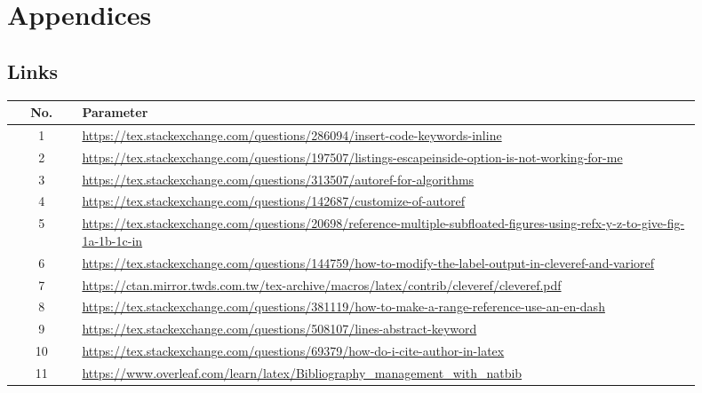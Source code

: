 \appendix
\section*{Appendices}
\renewcommand{\thesubsection}{\Alph{subsection}}

\subsection{Links}

\footnotesize
\begin{center}
    \label{table:lol}
    \begin{tabular}{ c p{0.9\linewidth} }
        \toprule
        No. & Parameter \\
        \midrule
        1 & \url{https://tex.stackexchange.com/questions/286094/insert-code-keywords-inline} \\
        2 & \url{https://tex.stackexchange.com/questions/197507/listings-escapeinside-option-is-not-working-for-me} \\
        3 & \url{https://tex.stackexchange.com/questions/313507/autoref-for-algorithms} \\
        4 & \url{https://tex.stackexchange.com/questions/142687/customize-of-autoref} \\
        5 & \url{https://tex.stackexchange.com/questions/20698/reference-multiple-subfloated-figures-using-refx-y-z-to-give-fig-1a-1b-1c-in} \\
        6 & \url{https://tex.stackexchange.com/questions/144759/how-to-modify-the-label-output-in-cleveref-and-varioref} \\
        7 & \url{https://ctan.mirror.twds.com.tw/tex-archive/macros/latex/contrib/cleveref/cleveref.pdf} \\
        8 & \url{https://tex.stackexchange.com/questions/381119/how-to-make-a-range-reference-use-an-en-dash} \\
        9 & \url{https://tex.stackexchange.com/questions/508107/lines-abstract-keyword} \\
        10 & \url{https://tex.stackexchange.com/questions/69379/how-do-i-cite-author-in-latex} \\
        11 & \url{https://www.overleaf.com/learn/latex/Bibliography_management_with_natbib} \\

\end{tabular}
\end{center}
